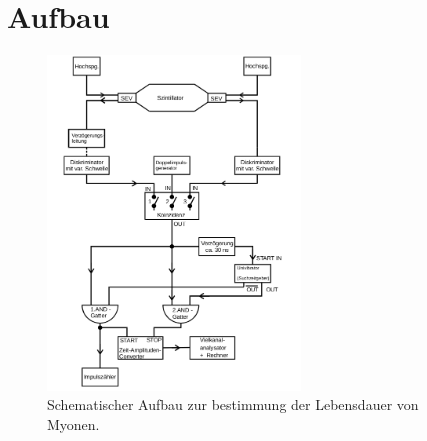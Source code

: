 \section{Aufbau}

\begin{figure}
    \centering
    \includegraphics[width=0.6\textwidth]{bilder/aufbau.png}
    \caption{Schematischer Aufbau zur bestimmung der Lebensdauer von Myonen. \cite{skript}} 
    \label{fig:1}
\end{figure}